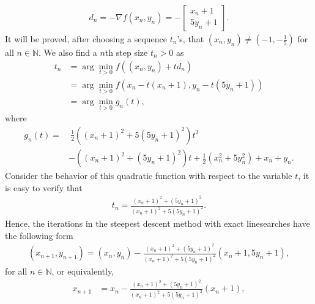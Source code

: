 \documentclass[a4paper]{article}
\numberwithin{equation}{section}
\begin{document}
\begin{enumerate}
\begin{align}
{d_n} =  - \nabla f\left( {{x_n},{y_n}} \right) =  - \left[ {\begin{array}{*{20}{c}}
{{x_n} + 1}\\
{5{y_n} + 1}
\end{array}} \right].
\end{align}
It will be proved, after choosing a sequence $t_n$'s, that $\left( {{x_n},{y_n}} \right) \ne \left( { - 1, - \frac{1}{5}} \right)$ for all $n\in \mathbb{N}$. We also find a $n$th step size $t_n>0$ as
\begin{align}
{t_n} &= \arg {\min _{t > 0}}f\left( {\left( {{x_n},{y_n}} \right) + t{d_n}} \right)\\
 &= \arg {\min _{t > 0}}f\left( {{x_n} - t\left( {{x_n} + 1} \right),{y_n} - t\left( {5{y_n} + 1} \right)} \right)\\
 &= \arg {\min _{t > 0}}{g_n}\left( t \right),
\end{align}
where
\begin{align}
{g_n}\left( t \right) =&\ \frac{1}{2}\left( {{{\left( {{x_n} + 1} \right)}^2} + 5{{\left( {5{y_n} + 1} \right)}^2}} \right){t^2}\\
& - \left( {{{\left( {{x_n} + 1} \right)}^2} + {{\left( {5{y_n} + 1} \right)}^2}} \right)t + \frac{1}{2}\left( {x_n^2 + 5y_n^2} \right) + {x_n} + {y_n}.
\end{align}
Consider the behavior of this quadratic function with respect to the variable $t$, it is easy to verify that 
\begin{align}
\label{1.12}
{t_n} = \frac{{{{\left( {{x_n} + 1} \right)}^2} + {{\left( {5{y_n} + 1} \right)}^2}}}{{{{\left( {{x_n} + 1} \right)}^2} + 5{{\left( {5{y_n} + 1} \right)}^2}}}.
\end{align}
Hence, the iterations in the steepest descent method with exact linesearches have the following form
\begin{align}
\left( {{x_{n + 1}},{y_{n + 1}}} \right) = \left( {{x_n},{y_n}} \right) - \frac{{{{\left( {{x_n} + 1} \right)}^2} + {{\left( {5{y_n} + 1} \right)}^2}}}{{{{\left( {{x_n} + 1} \right)}^2} + 5{{\left( {5{y_n} + 1} \right)}^2}}} \left( {{x_n} + 1,5{y_n} + 1} \right),
\end{align}
for all $n\in \mathbb{N}$, or equivalently,
\begin{align}
\label{1.14}
{x_{n + 1}} &= {x_n} - \frac{{{{\left( {{x_n} + 1} \right)}^2} + {{\left( {5{y_n} + 1} \right)}^2}}}{{{{\left( {{x_n} + 1} \right)}^2} + 5{{\left( {5{y_n} + 1} \right)}^2}}}\left( {{x_n} + 1} \right),\\

\end{align}
\end{enumerate}
\end{document}
